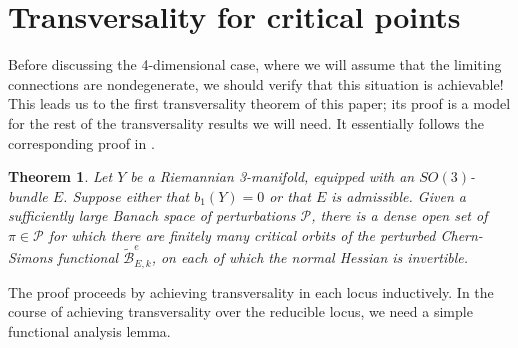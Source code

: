 \documentclass[10pt,a4paper]{amsart}
\newtheorem{theorem}{Theorem}
\theoremstyle{definition}
\theoremstyle{remark}
\numberwithin{figure}{qchap}
\begin{document}
\section{Transversality for critical points}\label{sec:3d-trans}
Before discussing the 4-dimensional case, where we will assume that the limiting connections are nondegenerate, we should verify that this situation is achievable! This leads us to the first transversality theorem of this paper; its proof is a model for the rest of the transversality results we will need. It essentially follows the corresponding proof in \cite{AB}.

\begin{theorem}\label{trans1}Let $Y$ be a Riemannian 3-manifold, equipped with an $SO(3)$-bundle $E$. Suppose either that $b_1(Y) = 0$ or that $E$ is admissible. Given a sufficiently large Banach space of perturbations $\mathcal P$, there is a dense open set of $\pi \in \mathcal P$ for which there are finitely many critical orbits of the perturbed Chern-Simons functional $\widetilde{\mathcal B}^{e}_{E,k}$, on each of which the normal Hessian is invertible.
\end{theorem}

The proof proceeds by achieving transversality in each locus inductively. In the course of achieving transversality over the reducible locus, we need a simple functional analysis lemma.
\end{document}

